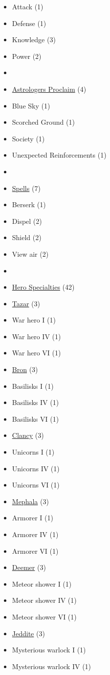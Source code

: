 \begin{multicols}{3}
\begin{itemize}[leftmargin=0pt, label={}, noitemsep, noitemsep]
  \item Attack (1)
  \item Defense (1)
  \item Knowledge (3)
  \item Power (2)
  \item
  \item \underline{Astrologers Proclaim} (4)
  \item Blue Sky (1)
  \item Scorched Ground (1)
  \item Society (1)
  \item Unexpected Reinforcements (1)
  \item
  \item \underline{Spells} (7)
  \item Berserk (1)
  \item Dispel (2)
  \item Shield (2)
  \item View air (2)
  \item
  \item \underline{Hero Specialties} (42)
  \item \underline{Tazar} (3)
  \item War hero I (1)
  \item War hero IV (1)
  \item War hero VI (1)
  \item \underline{Bron} (3)
  \item Basilisks I (1)
  \item Basilisks IV (1)
  \item Basilisks VI (1)
  \item \underline{Clancy} (3)
  \item Unicorns I (1)
  \item Unicorns IV (1)
  \item Unicorns VI (1)
  \item \underline{Mephala} (3)
  \item Armorer I (1)
  \item Armorer IV (1)
  \item Armorer VI (1)
  \item \underline{Deemer} (3)
  \item Meteor shower I (1)
  \item Meteor shower IV (1)
  \item Meteor shower VI (1)
  \item \underline{Jeddite} (3)
  \item Mysterious warlock I (1)
  \item Mysterious warlock IV (1)

\end{itemize}
\end{multicols}
